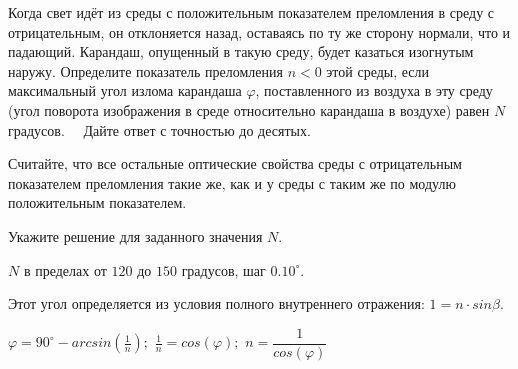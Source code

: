 Когда свет идёт из среды с положительным показателем преломления в
среду с отрицательным, он отклоняется назад, оставаясь по ту же сторону
нормали, что и падающий. Карандаш, опущенный в такую среду, будет казаться
изогнутым наружу. Определите  показатель преломления $n < 0$
этой среды, если максимальный угол излома карандаша $\varphi$,
поставленного из воздуха в эту среду (угол 
поворота изображения в среде относительно карандаша в воздухе) равен $N$ градусов.   Дайте ответ с точностью до десятых. 

Считайте, что все остальные оптические свойства среды с отрицательным показателем преломления такие же, как и у среды с таким же по модулю положительным показателем.

Укажите решение для заданного значения $N$.

\paramSection

$N$ в пределах от $120$ до $150$ градусов, шаг $0.10^{\circ}$.

\solutionSection

Этот угол определяется из условия полного внутреннего отражения: $1=n \cdot sin\beta$.


$\varphi =90^{\circ}-arcsin(\frac{1}{n});$   $\frac{1}{n}=cos(\varphi );$   $n=\dfrac{1}{cos(\varphi )}$ 

